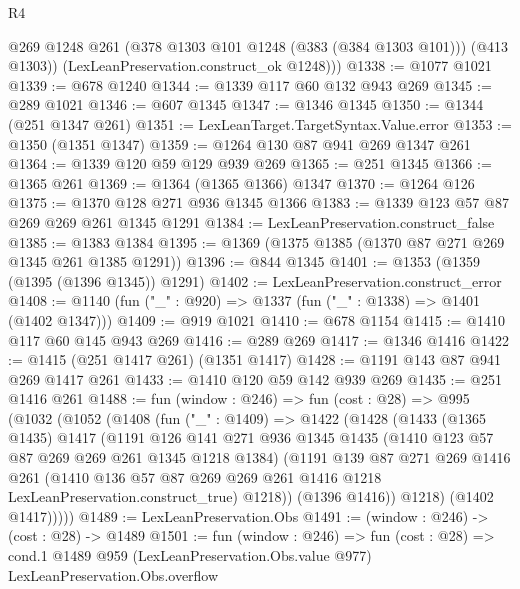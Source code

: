 \begin{lexlean}{R4}
\begin{coremodule}
{{{{{{{{{{{{{{          @269
          @1248
          @261
          (@378 @1303 @101 @1248 (@383 (@384 @1303 @101)))
          (@413 @1303))
        (LexLeanPreservation.construct_ok @1248)))
@1338 := @1077 @1021
@1339 := @678 @1240
@1344 := @1339 @117 @60 @132 @943 @269
@1345 := @289 @1021
@1346 := @607 @1345
@1347 := @1346 @1345
@1350 := @1344 (@251 @1347 @261)
@1351 := LexLeanTarget.TargetSyntax.Value.error
@1353 := @1350 (@1351 @1347)
@1359 := @1264 @130 @87 @941 @269 @1347 @261
@1364 := @1339 @120 @59 @129 @939 @269
@1365 := @251 @1345
@1366 := @1365 @261
@1369 := @1364 (@1365 @1366) @1347
@1370 := @1264 @126
@1375 := @1370 @128 @271 @936 @1345 @1366
@1383 := @1339 @123 @57 @87 @269 @269 @261 @1345 @1291
@1384 := LexLeanPreservation.construct_false
@1385 := @1383 @1384
@1395 := @1369 (@1375 @1385 (@1370 @87 @271 @269 @1345 @261 @1385 @1291))
@1396 := @844 @1345
@1401 := @1353 (@1359 (@1395 (@1396 @1345)) @1291)
@1402 := LexLeanPreservation.construct_error
@1408 := @1140 (fun ("_" : @920) => @1337 (fun ("_" : @1338) => @1401 (@1402 @1347)))
@1409 := @919 @1021
@1410 := @678 @1154
@1415 := @1410 @117 @60 @145 @943 @269
@1416 := @289 @269
@1417 := @1346 @1416
@1422 := @1415 (@251 @1417 @261) (@1351 @1417)
@1428 := @1191 @143 @87 @941 @269 @1417 @261
@1433 := @1410 @120 @59 @142 @939 @269
@1435 := @251 @1416 @261
@1488 := fun (window : @246) =>
  fun (cost : @28) =>
  @995
    (@1032
      (@1052
        (@1408
          (fun ("_" : @1409) =>
          @1422
            (@1428
              (@1433
                (@1365 @1435)
                @1417
                (@1191
                  @126
                  @141
                  @271
                  @936
                  @1345
                  @1435
                  (@1410 @123 @57 @87 @269 @269 @261 @1345 @1218 @1384)
                  (@1191
                    @139
                    @87
                    @271
                    @269
                    @1416
                    @261
                    (@1410
                      @136
                      @57
                      @87
                      @269
                      @269
                      @261
                      @1416
                      @1218
                      LexLeanPreservation.construct_true)
                    @1218))
                (@1396 @1416))
              @1218)
            (@1402 @1417)))))
@1489 := LexLeanPreservation.Obs
@1491 := (window : @246) -> (cost : @28) -> @1489
@1501 := fun (window : @246) =>
  fun (cost : @28) =>
  cond.{1} @1489 @959 (LexLeanPreservation.Obs.value @977) LexLeanPreservation.Obs.overflow
}}}}}}}}}}}}}}
\end{coremodule}
\end{lexlean}
